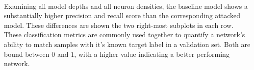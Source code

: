 \documentclass[12pt,letterpaper]{article}
\begin{document}
\paragraph*{}Examining all model depths and all neuron densities, the baseline model shows a substantially higher precision and recall score than the corresponding attacked model. These differences are shown the two right-most subplots in each row. These classification metrics are commonly used together to quantify a network's ability to match samples with it's known target label in a validation set. Both are bound between $0$ and $1$, with a higher value indicating a better performing network.
\end{document}

